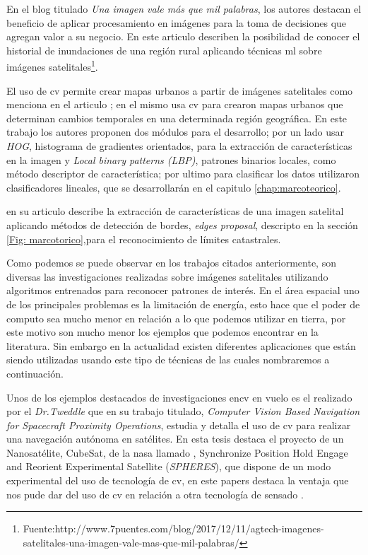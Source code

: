 En el blog titulado \textit{Una imagen vale más que mil palabras}, los autores destacan el beneficio de aplicar procesamiento en imágenes para la toma de decisiones que agregan valor a su negocio. En este articulo describen la posibilidad de conocer el historial de inundaciones de una región rural aplicando técnicas \ac{ml} sobre imágenes satelitales\footnote{Fuente:http://www.7puentes.com/blog/2017/12/11/agtech-imagenes-satelitales-una-imagen-vale-mas-que-mil-palabras/}.

El uso de \ac{cv} permite crear mapas urbanos a partir de imágenes satelitales como menciona en el articulo \citep{detectionHOG}; en el mismo usa \ac{cv} para crearon mapas urbanos que determinan cambios temporales en una determinada región geográfica. En este trabajo los autores proponen dos módulos para el desarrollo; por un lado usar \textit{HOG}, histograma de gradientes orientados, para la extracción de características en la imagen y \textit{Local binary patterns (LBP)}, patrones binarios locales, como método descriptor de característica; por ultimo para clasificar los datos utilizaron clasificadores lineales, que se desarrollarán en el capitulo \ref{chap:marcoteorico}. 

\cite{usman} en su articulo describe la extracción de características de una imagen satelital aplicando métodos de  detección de bordes, \textit{edges proposal}, descripto en la sección \ref{Fig: marcotorico},para el reconocimiento de límites catastrales.

Como podemos se puede observar en los trabajos citados anteriormente, son diversas las investigaciones realizadas sobre imágenes satelitales utilizando algoritmos entrenados para reconocer patrones de interés. En el área espacial uno de los principales problemas es la limitación de energía, esto hace que el poder de computo sea mucho menor en relación a lo que podemos utilizar en tierra, por este motivo son mucho menor los ejemplos que podemos encontrar en la literatura. Sin embargo en la actualidad existen diferentes aplicaciones que están siendo utilizadas usando este tipo de técnicas de las cuales nombraremos a continuación.

Unos de los ejemplos destacados de investigaciones en\ac{cv} en vuelo es el realizado por el \textit{Dr.Tweddle} que en su trabajo titulado, \textit{Computer Vision Based Navigation for Spacecraft Proximity Operations}, estudia y detalla el uso de \ac{cv} para realizar una navegación autónoma en satélites. En esta tesis destaca el proyecto de un Nanosatélite, CubeSat, de la \ac{nasa} llamado , Synchronize Position Hold Engage and Reorient Experimental Satellite (\textit{SPHERES}), que dispone de un modo experimental del uso de tecnología de \ac{cv}, en este papers destaca la ventaja que nos pude dar del uso de \ac{cv} en relación a otra tecnología de sensado \citep{Brent}.

